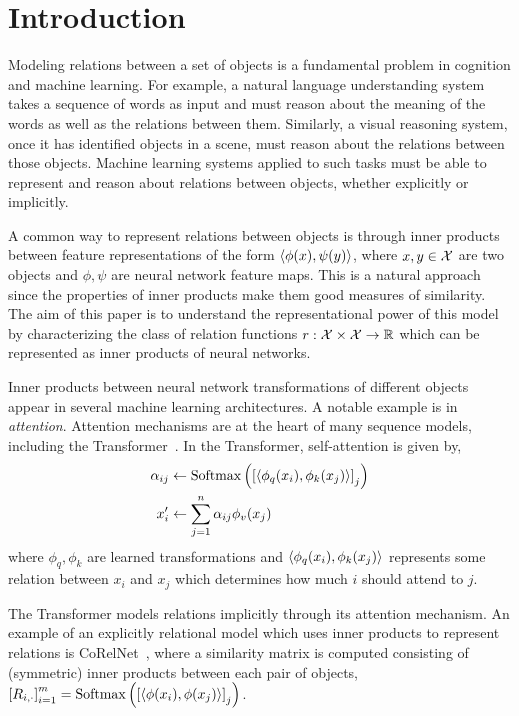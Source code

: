 \section{Introduction}\label{sec:intro}

Modeling relations between a set of objects is a fundamental problem in cognition and machine learning. For example, a natural language understanding system takes a sequence of words as input and must reason about the meaning of the words as well as the relations between them. Similarly, a visual reasoning system, once it has identified objects in a scene, must reason about the relations between those objects. Machine learning systems applied to such tasks must be able to represent and reason about relations between objects, whether explicitly or implicitly.

A common way to represent relations between objects is through inner products between feature representations of the form $\left \langle \phi(x), \psi(y) \right\rangle$, where $x, y \in {\mathcal{X}}$ are two objects and $\phi, \psi$ are neural network feature maps. This is a natural approach since the properties of inner products make them good measures of similarity. The aim of this paper is to understand the representational power of this model by characterizing the class of relation functions $r: {\mathcal{X}} \times {\mathcal{X}} \to \mathbb{R}$ which can be represented as inner products of neural networks.

Inner products between neural network transformations of different objects appear in several machine learning architectures. A notable example is in \textit{attention}. Attention mechanisms are at the heart of many sequence models, including the Transformer~\parencite{vaswani2017attention}. In the Transformer, self-attention is given by,
\begin{equation*}
    \begin{split}
        \alpha_{ij} &\gets \mathrm{Softmax}\left(\left[\left \langle \phi_q(x_i), \phi_k(x_j) \right\rangle\right]_j\right)\\
        x_i' &\gets \sum_{j=1}^{n} \alpha_{ij} \phi_v(x_j)
    \end{split}
\end{equation*}
where $\phi_q, \phi_k$ are learned transformations and $\left \langle \phi_q(x_i), \phi_k(x_j) \right\rangle$ represents some relation between $x_i$ and $x_j$ which determines how much $i$ should attend to $j$.

The Transformer models relations implicitly through its attention mechanism. An example of an explicitly relational model which uses inner products to represent relations is CoRelNet~\parencite{kergNeuralArchitecture2022}, where a similarity matrix is computed consisting of (symmetric) inner products between each pair of objects, $\left[R_{i,\cdot}\right]_{i=1}^m = \mathrm{Softmax}\left(\left[\left \langle \phi(x_i), \phi(x_j) \right\rangle\right]_j\right)$.

